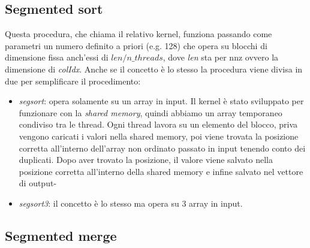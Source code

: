 \documentclass[]{IEEEtran}
\begin{document}
	\subsection{Segmented sort}
	\label{seg-sort}
	Questa procedura, che chiama il relativo kernel, funziona passando come parametri un numero definito a priori (e.g. 128) che opera su blocchi di dimensione fissa anch'essi di $ len/n\_threads $, dove \textit{len} sta per nnz ovvero la dimensione di \textit{colIdx}.\newline
	Anche se il concetto è lo stesso la procedura viene divisa in due per semplificare il procedimento:
	\begin{itemize}
		\item \textit{segsort}: opera solamente su un array in input. Il kernel è stato sviluppato per funzionare con la \textit{shared memory}, quindi abbiamo un array temporaneo condiviso tra le thread. Ogni thread lavora su un elemento del blocco, priva vengono caricati i valori nella shared memory, poi viene trovata la posizione corretta all'interno dell'array non ordinato passato in input tenendo conto dei duplicati. Dopo aver trovato la posizione, il valore viene salvato nella posizione corretta all'interno della shared memory e infine salvato nel vettore di output-
		\item \textit{segsort3}: il concetto è lo stesso ma opera su 3 array in input.
	\end{itemize}
	
	\subsection{Segmented merge}
	\label{seg-merge}

	
\end{document}
